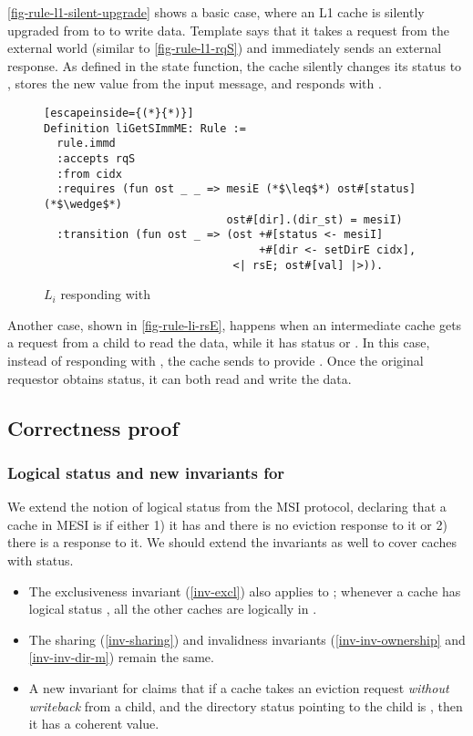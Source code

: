 \autoref{fig-rule-l1-silent-upgrade} shows a basic case, where an L1 cache is silently upgraded from \stE{} to \stM{} to write data.
Template  says that it takes a request from the external world (similar to \autoref{fig-rule-l1-rqS}) and immediately sends an external response.
As defined in the state  function, the cache silently changes its status to \stM{}, stores the new value from the input message, and responds with .

\begin{figure}[h]
  \centering
\begin{lstlisting}[escapeinside={(*}{*)}]
Definition liGetSImmME: Rule :=
  rule.immd
  :accepts rqS
  :from cidx
  :requires (fun ost _ _ => mesiE (*$\leq$*) ost#[status] (*$\wedge$*)
                            ost#[dir].(dir_st) = mesiI)
  :transition (fun ost _ => (ost +#[status <- mesiI]
                                 +#[dir <- setDirE cidx],
                             <| rsE; ost#[val] |>)).
\end{lstlisting}
  \caption{$L_i$ responding with }
  \label{fig-rule-li-rsE}
\end{figure}

Another case, shown in \autoref{fig-rule-li-rsE}, happens when an intermediate cache gets a request from a child to read the data, while it has status \stE{} or \stM{}.
In this case, instead of responding with , the cache sends  to provide \stE{}.
Once the original requestor obtains \stE{} status, it can both read and write the data.

\subsection{Correctness proof}
\label{sec-mesi-proof}

\subsubsection{Logical status and new invariants for \stE{}}

We extend the notion of logical status from the MSI protocol, declaring that a cache in MESI is \stE{} if either 1) it has \stE{} and there is no eviction response to it or 2) there is a response  to it.
We should extend the invariants as well to cover caches with \stE{} status.
\begin{itemize}
\item The exclusiveness invariant (\autoref{inv-excl}) also applies to \stE{}; whenever a cache has logical status \stE{}, all the other caches are logically in \stI{}.
\item The sharing (\autoref{inv-sharing}) and invalidness invariants (\autoref{inv-inv-ownership} and \autoref{inv-inv-dir-m}) remain the same.
\item A new invariant for \stE{} claims that if a cache takes an eviction request \emph{without writeback} from a child, and the directory status pointing to the child is \stE{}, then it has a coherent value.
\end{itemize}

